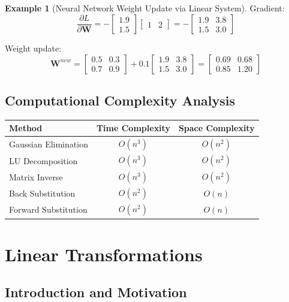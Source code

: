\documentclass[12pt,a4paper]{article}
\theoremstyle{definition}
\newtheorem{example}{Example}[section]
\begin{document}
\begin{example}[Neural Network Weight Update via Linear System]
Gradient:
\[
\frac{\partial L}{\partial \mathbf{W}} = -\begin{bmatrix} 1.9 \\ 1.5 \end{bmatrix} \begin{bmatrix} 1 & 2 \end{bmatrix} = -\begin{bmatrix} 1.9 & 3.8 \\ 1.5 & 3.0 \end{bmatrix}
\]

Weight update:
\[
\mathbf{W}^{new} = \begin{bmatrix} 0.5 & 0.3 \\ 0.7 & 0.9 \end{bmatrix} + 0.1 \begin{bmatrix} 1.9 & 3.8 \\ 1.5 & 3.0 \end{bmatrix} = \begin{bmatrix} 0.69 & 0.68 \\ 0.85 & 1.20 \end{bmatrix}
\]
\end{example}

\subsection{Computational Complexity Analysis}

\begin{center}
\begin{tabular}{|l|c|c|}
\hline
\textbf{Method} & \textbf{Time Complexity} & \textbf{Space Complexity} \\
\hline
Gaussian Elimination & $O(n^3)$ & $O(n^2)$ \\
LU Decomposition & $O(n^3)$ & $O(n^2)$ \\
Matrix Inverse & $O(n^3)$ & $O(n^2)$ \\
Back Substitution & $O(n^2)$ & $O(n)$ \\
Forward Substitution & $O(n^2)$ & $O(n)$ \\
\hline
\end{tabular}
\end{center}

\newpage

\section{Linear Transformations}

\subsection{Introduction and Motivation}
\end{document}
